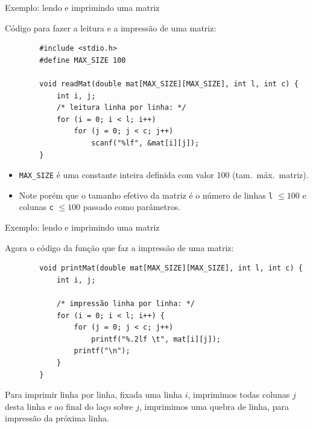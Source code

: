 \documentclass[handout]{beamer}
\newcommand{\cod}[1]{\texttt{#1}}
\begin{document}
\begin{frame}[fragile]{Exemplo: lendo e imprimindo uma matriz}

    \small
    Código para fazer a leitura e a impressão de uma matriz:

    \begin{verbatim}
        #include <stdio.h>
        #define MAX_SIZE 100

        void readMat(double mat[MAX_SIZE][MAX_SIZE], int l, int c) {
            int i, j;
            /* leitura linha por linha: */
            for (i = 0; i < l; i++)
                for (j = 0; j < c; j++)
                    scanf("%lf", &mat[i][j]);
        }
    \end{verbatim}

    \begin{itemize}
        \item \texttt{MAX\_SIZE} é uma constante inteira definida com valor 100 (tam.\ máx.\ matriz).
        \item Note porém que o tamanho efetivo da matriz é o número de linhas \cod{l} $\le 100$ e colunas \cod{c} $\le 100$ passado como parâmetros.
    \end{itemize}

\end{frame}

\begin{frame}[fragile]{Exemplo: lendo e imprimindo uma matriz}

    Agora o código da função que faz a impressão de uma matriz:

    \begin{verbatim}
        void printMat(double mat[MAX_SIZE][MAX_SIZE], int l, int c) {
            int i, j;

            /* impressão linha por linha: */
            for (i = 0; i < l; i++) {
                for (j = 0; j < c; j++)
                    printf("%.2lf \t", mat[i][j]);
                printf("\n");
            }
        }
    \end{verbatim}

    Para imprimir linha por linha, fixada uma linha $i$, imprimimos todas colunas $j$ desta linha e ao final do laço sobre $j$, imprimimos uma quebra de linha, para impressão da próxima linha.

\end{frame}
\end{document}
